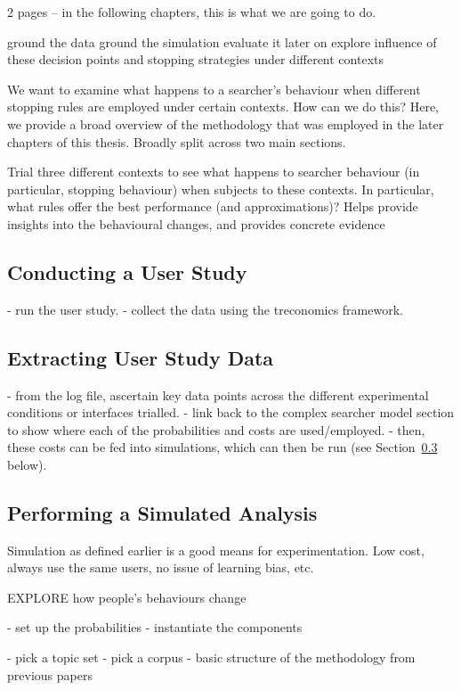 2 pages -- in the following chapters, this is what we are going to do.

ground the data
ground the simulation
evaluate it later on
explore influence of these decision points and stopping strategies under different contexts

We want to examine what happens to a searcher's behaviour when different stopping rules are employed under certain contexts.
How can we do this? Here, we provide a broad overview of the methodology that was employed in the later chapters of this thesis. Broadly split across two main sections.

Trial three different contexts to see what happens to searcher behaviour (in particular, stopping behaviour) when subjects to these contexts. In particular, what rules offer the best performance (and approximations)? Helps provide insights into the behavioural changes, and provides concrete evidence 

\subsection{Conducting a User Study}
- run the user study.
- collect the data using the treconomics framework.

\subsection{Extracting User Study Data}
- from the log file, ascertain key data points across the different experimental conditions or interfaces trialled.
- link back to the complex searcher model section to show where each of the probabilities and costs are used/employed.
- then, these costs can be fed into simulations, which can then be run (see Section~\ref{sec:proposal:method:simulations} below).

\subsection{Performing a Simulated Analysis}\label{sec:proposal:method:simulations}
Simulation as defined earlier is a good means for experimentation.
Low cost, always use the same users, no issue of learning bias, etc.

EXPLORE how people's behaviours change

- set up the probabilities
- instantiate the components

- pick a topic set
- pick a corpus
- basic structure of the methodology from previous papers

